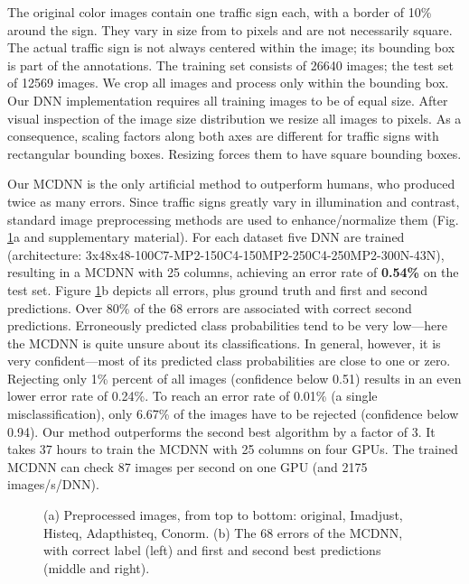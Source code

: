 \documentclass[a4paper]{article}
\begin{document}
The original color images contain one traffic sign each, 
with a border of 10\% around the sign. They vary in size
from  to  pixels and are not necessarily
square. The actual traffic sign is not always centered within the
image; its bounding box is part of the
annotations. The training set consists of 26640 images; the test
set of 12569 images. We crop all images and 
process only within the bounding box. Our DNN implementation requires all
training images to be of equal size. After visual
inspection of the image size distribution  we
resize all images to  pixels. As a consequence, scaling
factors along both axes are different for traffic signs with
rectangular bounding boxes. Resizing forces them to have square
bounding boxes.

Our MCDNN is the only artificial method to outperform humans, who produced twice as many errors. Since traffic signs greatly vary in illumination and contrast, standard image preprocessing methods are used  to enhance/normalize them (Fig. \ref{fig:GTSRB}a and supplementary material). For each dataset five DNN are trained (architecture: 3x48x48-100C7-MP2-150C4-150MP2-250C4-250MP2-300N-43N), resulting in a MCDNN with 25 columns, achieving an error rate of {\bf 0.54\%} on the test set. Figure \ref{fig:GTSRB}b depicts all errors, plus ground truth and first and second predictions. Over 80\% of the 68 errors are associated with correct second predictions. Erroneously predicted class probabilities tend to be very low---here the MCDNN is quite unsure about its classifications. In general, however,  it is very confident---most of its predicted class probabilities are close to one or zero. Rejecting only 1\% percent of all images (confidence below 0.51) results in an even lower error rate of 0.24\%. To reach an error rate of 0.01\% (a single misclassification), only 6.67\% of the images have to be rejected (confidence below 0.94). Our method outperforms the second best algorithm by a factor of 3.  It takes 37 hours to train the MCDNN with 25 columns on four GPUs. The trained MCDNN can check 87 images per second on one GPU (and 2175 images/s/DNN).

\begin{figure}[h]
	\centering
	\setlength{\fboxsep}{5pt}
	\setlength{\fboxrule}{0pt}
	\caption{(a) Preprocessed images, from top to bottom: original, Imadjust, Histeq, Adapthisteq, Conorm. (b) The 68 errors of the MCDNN, with correct label (left) and first and second best predictions (middle and right).}

\label{fig:GTSRB}
\end{figure}
\end{document}
